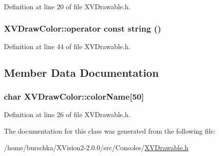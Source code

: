 Definition at line 20 of file XVDrawable.h.\label{XVDrawColor_a6}
\hypertarget{class_XVDrawColor_a6}{
\subsubsection[operator const string]{\setlength{\rightskip}{0pt plus 5cm}XVDraw\-Color::operator const string ()}}




Definition at line 44 of file XVDrawable.h.

\subsection{Member Data Documentation}
\label{XVDrawColor_m0}
\hypertarget{class_XVDrawColor_m0}{
\subsubsection[colorName]{\setlength{\rightskip}{0pt plus 5cm}char XVDraw\-Color::color\-Name\mbox{[}50\mbox{]}}}




Definition at line 26 of file XVDrawable.h.

The documentation for this class was generated from the following file:\begin{CompactItemize}
\item 
/home/burschka/XVision2-2.0.0/src/Consoles/\hyperlink{XVDrawable.h-source}{XVDrawable.h}\end{CompactItemize}
